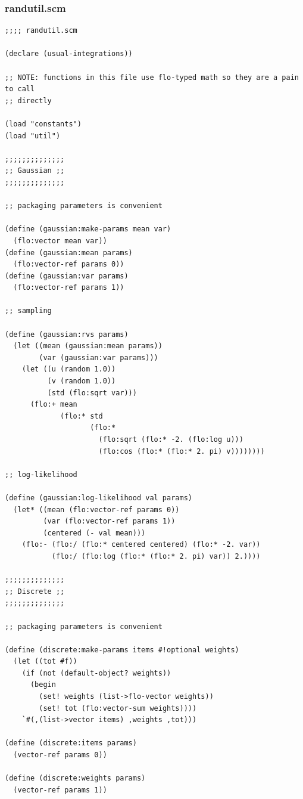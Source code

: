 \documentclass{article}
\begin{document}
\subsubsection{randutil.scm}

\begin{verbatim}
;;;; randutil.scm

(declare (usual-integrations))

;; NOTE: functions in this file use flo-typed math so they are a pain to call
;; directly

(load "constants")
(load "util")

;;;;;;;;;;;;;;
;; Gaussian ;;
;;;;;;;;;;;;;;

;; packaging parameters is convenient

(define (gaussian:make-params mean var)
  (flo:vector mean var))
(define (gaussian:mean params)
  (flo:vector-ref params 0))
(define (gaussian:var params)
  (flo:vector-ref params 1))

;; sampling

(define (gaussian:rvs params)
  (let ((mean (gaussian:mean params))
        (var (gaussian:var params)))
    (let ((u (random 1.0))
          (v (random 1.0))
          (std (flo:sqrt var)))
      (flo:+ mean
             (flo:* std
                    (flo:*
                      (flo:sqrt (flo:* -2. (flo:log u)))
                      (flo:cos (flo:* (flo:* 2. pi) v))))))))

;; log-likelihood

(define (gaussian:log-likelihood val params)
  (let* ((mean (flo:vector-ref params 0))
         (var (flo:vector-ref params 1))
         (centered (- val mean)))
    (flo:- (flo:/ (flo:* centered centered) (flo:* -2. var))
           (flo:/ (flo:log (flo:* (flo:* 2. pi) var)) 2.))))

;;;;;;;;;;;;;;
;; Discrete ;;
;;;;;;;;;;;;;;

;; packaging parameters is convenient

(define (discrete:make-params items #!optional weights)
  (let ((tot #f))
    (if (not (default-object? weights))
      (begin
        (set! weights (list->flo-vector weights))
        (set! tot (flo:vector-sum weights))))
    `#(,(list->vector items) ,weights ,tot)))

(define (discrete:items params)
  (vector-ref params 0))

(define (discrete:weights params)
  (vector-ref params 1))


\end{verbatim}
\end{document}
